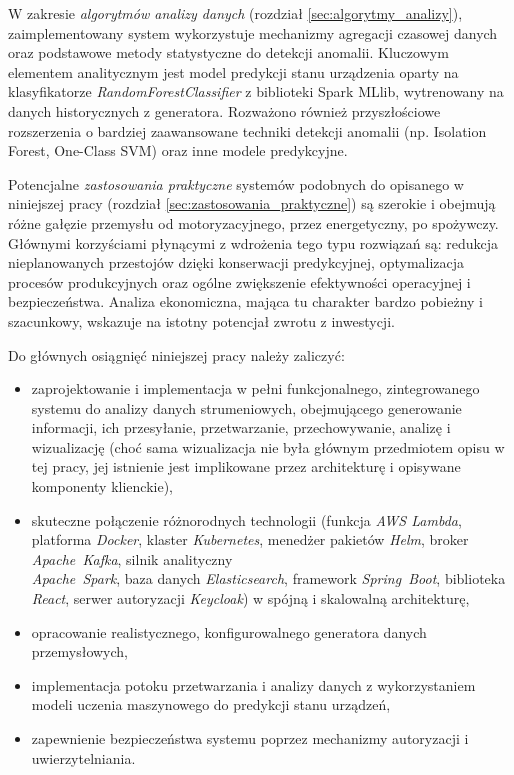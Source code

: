 W zakresie \textit{algorytmów analizy danych} (rozdział \ref{sec:algorytmy_analizy}), zaimplementowany system wykorzystuje mechanizmy agregacji czasowej danych oraz podstawowe metody statystyczne do detekcji anomalii. Kluczowym elementem analitycznym jest model predykcji stanu urządzenia oparty na klasyfikatorze \textit{RandomForestClassifier} z biblioteki Spark MLlib, wytrenowany na danych historycznych z generatora. Rozważono również przyszłościowe rozszerzenia o bardziej zaawansowane techniki detekcji anomalii (np. Isolation Forest, One-Class SVM) oraz inne modele predykcyjne.

Potencjalne \textit{zastosowania praktyczne} systemów podobnych do opisanego w niniejszej pracy (rozdział \ref{sec:zastosowania_praktyczne}) są szerokie i obejmują różne gałęzie przemysłu od motoryzacyjnego, przez energetyczny, po spożywczy. Głównymi korzyściami płynącymi z wdrożenia tego typu rozwiązań są: redukcja nieplanowanych przestojów dzięki konserwacji predykcyjnej, optymalizacja procesów produkcyjnych oraz ogólne zwiększenie efektywności operacyjnej i bezpieczeństwa. Analiza ekonomiczna, mająca tu charakter bardzo pobieżny i szacunkowy, wskazuje na istotny potencjał zwrotu z inwestycji.

\vspace{0.3em}

Do głównych osiągnięć niniejszej pracy należy zaliczyć:
\begin{itemize}
    \item zaprojektowanie i implementacja w pełni funkcjonalnego, zintegrowanego systemu do analizy danych  strumeniowych, obejmującego generowanie informacji, ich przesyłanie, przetwarzanie, przechowywanie, analizę i wizualizację (choć sama wizualizacja nie była głównym przedmiotem opisu w tej pracy, jej istnienie jest implikowane przez architekturę i opisywane komponenty klienckie),
    \item skuteczne połączenie różnorodnych technologii (funkcja \textit{AWS Lambda}, platforma \textit{Docker}, klaster \textit{Kubernetes}, menedżer pakietów \textit{Helm}, broker \mbox{\textit{Apache Kafka}}, silnik analityczny \\ \mbox{\textit{Apache Spark}}, baza danych \textit{Elasticsearch}, framework \mbox{\textit{Spring Boot}}, biblioteka \textit{React}, serwer autoryzacji \textit{Keycloak}) w spójną i skalowalną architekturę,
    \item opracowanie realistycznego, konfigurowalnego generatora danych przemysłowych,
    \item implementacja potoku przetwarzania i analizy danych z wykorzystaniem modeli uczenia maszynowego do predykcji stanu urządzeń,
    \item zapewnienie bezpieczeństwa systemu poprzez mechanizmy autoryzacji i uwierzytelniania.
\end{itemize}

